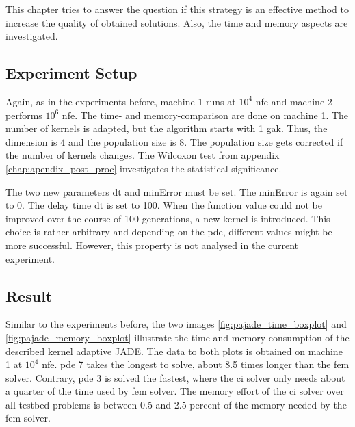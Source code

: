 \documentclass[./\jobname.tex]{subfiles}
\begin{document}
This chapter tries to answer the question if this strategy is an effective method to increase the quality of obtained solutions. Also, the time and memory aspects are investigated. 

\subsection{Experiment Setup}

Again, as in the experiments before, machine 1 runs at $10^4$ \gls{nfe} and machine 2 performs $10^6$ \gls{nfe}. The time- and memory-comparison are done on machine 1. The number of kernels is adapted, but the algorithm starts with 1 \gls{gak}. Thus, the dimension is 4 and the population size is 8. The population size gets corrected if the number of kernels changes. The Wilcoxon test from appendix \ref{chap:apendix_post_proc} investigates the statistical significance. 

The two new parameters \gls{dt} and minError must be set. The minError is again set to 0. The delay time \gls{dt} is set to 100. When the function value could not be improved over the course of 100 generations, a new kernel is introduced. This choice is rather arbitrary and depending on the \gls{pde}, different values might be more successful. However, this property is not analysed in the current experiment.

\subsection{Result}
\label{chap:results_ex2}

Similar to the experiments before, the two images \ref{fig:pajade_time_boxplot} and \ref{fig:pajade_memory_boxplot} illustrate the time and memory consumption of the described kernel adaptive JADE. The data to both plots is obtained on machine 1 at $10^4$ \gls{nfe}. \gls{pde} 7 takes the longest to solve, about 8.5 times longer than the \gls{fem} solver. Contrary, \gls{pde} 3 is solved the fastest, where the \gls{ci} solver only needs about a quarter of the time used by \gls{fem} solver. The memory effort of the \gls{ci} solver over all testbed problems is between 0.5 and 2.5 percent of the memory needed by the \gls{fem} solver. 
\end{document}
